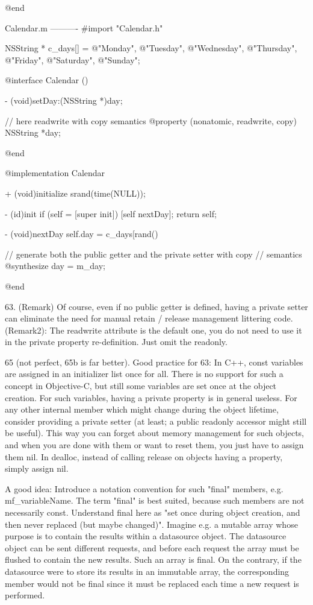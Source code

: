 @end


Calendar.m
----------
#import "Calendar.h"

NSString * c_days[] = {@"Monday", @"Tuesday", @"Wednesday", @"Thursday",
                      @"Friday", @"Saturday", @"Sunday"};

@interface Calendar ()

- (void)setDay:(NSString *)day;

// here readwrite with copy semantics
@property (nonatomic, readwrite, copy) NSString *day;

@end

@implementation Calendar

+ (void)initialize
{
 srand(time(NULL));
}

- (id)init
{
 if (self = [super init]) {
   [self nextDay];
 }
 return self;
}

- (void)nextDay
{
 self.day = c_days[rand() %
}

// generate both the public getter and the private setter with copy
// semantics
@synthesize day = m_day;

@end

63. (Remark) Of course, even if no public getter is defined, having a
private setter can eliminate the need for manual retain / release management
littering code.
(Remark2): The readwrite attribute is the default one, you do not need to
use it in the private property re-definition. Just omit the readonly.

 65 (not perfect, 65b is far better). Good practice for 63: In C++, const
variables are assigned in an initializer list once for all. There is no
support for such a concept in Objective-C, but still some variables are set
once at the object creation. For such variables, having a private property
is in general useless. For any other internal member which might change
during the object lifetime, consider providing a private setter (at least; a
public readonly accessor might still be useful). This way you can forget
about memory management for such objects, and when you are done with them or
want to reset them, you just have to assign them nil. In dealloc, instead of
calling release on objects having a property, simply assign nil.

A good idea: Introduce a notation convention for such "final" members, e.g.
mf_variableName.
The term "final" is best suited, because such members are not necessarily
const. Understand final here as "set once during object creation, and then
never replaced (but maybe changed)". Imagine e.g. a mutable array whose
purpose is to contain the results within a datasource object. The datasource
object can be sent different requests, and before each request the array
must be flushed to contain the new results. Such an array is final.
On the contrary, if the datasource were to store its results in an immutable
array, the corresponding member would not be final since it must be replaced
each time a new request is performed.

